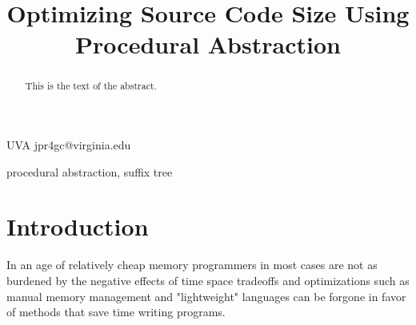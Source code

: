 \documentclass[9pt,nocopyrightspace]{sigplanconf}
\begin{document}
\setlength{\pdfpageheight}{\paperheight}
\setlength{\pdfpagewidth}{\paperwidth}






\title{Optimizing Source Code Size Using Procedural Abstraction}
\subtitle{}

           {UVA}
           {jpr4gc@virginia.edu}

\maketitle

\begin{abstract}
This is the text of the abstract.
\end{abstract}



\keywords
procedural abstraction, suffix tree

\section{Introduction}

In an age of relatively cheap memory programmers in most cases are not as burdened by the negative effects of time space tradeoffs and optimizations such as manual memory management and "lightweight" languages can be forgone in favor of methods that save time writing programs.
\end{document}
